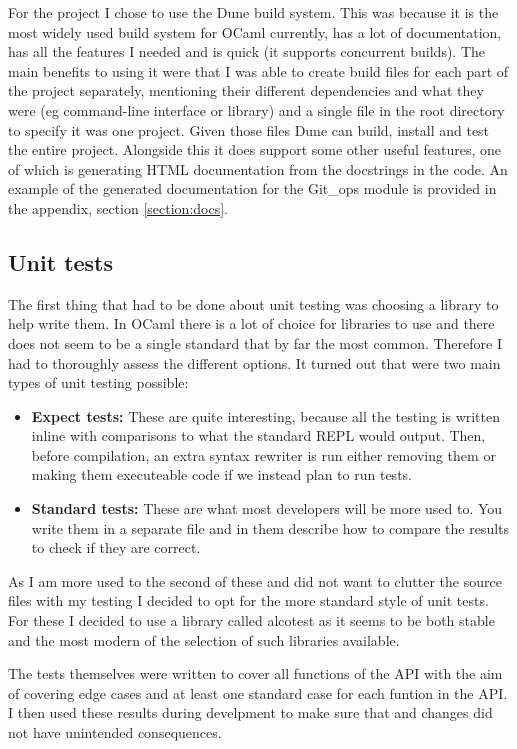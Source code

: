 For the project I chose to use the Dune\cite{code_dune} build system. This was because it is the most widely used build system for OCaml currently, has a lot of documentation, has all the features I needed and is quick (it supports concurrent builds). The main benefits to using it were that I was able to create build files for each part of the project separately, mentioning their different dependencies and what they were (eg command-line interface or library) and a single file in the root directory to specify it was one project. Given those files Dune can build, install and test the entire project. Alongside this it does support some other useful features, one of which is generating HTML documentation from the docstrings in the code. An example of the generated documentation for the Git\_ops module is provided in the appendix, section \ref{section:docs}.

\subsection{Unit tests}

The first thing that had to be done about unit testing was choosing a library to help write them. In OCaml there is a lot of choice for libraries to use and there does not seem to be a single standard that by far the most common. Therefore I had to thoroughly assess the different options. It turned out that were two main types of unit testing possible:
\begin{itemize}
  \item \textbf{Expect tests:} These are quite interesting, because all the testing is written inline with comparisons to what the standard REPL would output. Then, before compilation, an extra syntax rewriter is run either removing them or making them executeable code if we instead plan to run tests.
  \item \textbf{Standard tests:} These are what most developers will be more used to. You write them in a separate file and in them describe how to compare the results to check if they are correct.
\end{itemize}
As I am more used to the second of these and did not want to clutter the source files with my testing I decided to opt for the more standard style of unit tests. For these I decided to use a library called alcotest\cite{code_alcotest} as it seems to be both stable and the most modern of the selection of such libraries available.

The tests themselves were written to cover all functions of the API with the aim of covering edge cases and at least one standard case for each funtion in the API. I then used these results during develpment to make sure that and changes did not have unintended consequences.

